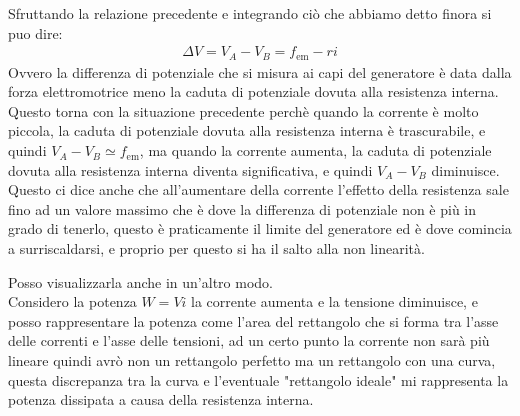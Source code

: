 \documentclass[a4paper, oneside]{article}
\begin{document}
    Sfruttando la relazione precedente e integrando ciò che abbiamo detto finora si puo dire:
    \begin{gather*}
        \Delta V = V_A - V_B = f_\text{em} - r i
    \end{gather*}
    Ovvero la differenza di potenziale che si misura ai capi del generatore è data dalla forza elettromotrice meno la caduta di potenziale dovuta alla resistenza interna.\\
    Questo torna con la situazione precedente perchè quando la corrente è molto piccola, la caduta di potenziale dovuta alla resistenza interna è trascurabile, e quindi $V_A - V_B \simeq f_\text{em}$, ma quando la corrente aumenta, la caduta di potenziale dovuta alla resistenza interna diventa significativa, e quindi $V_A - V_B$ diminuisce.\\
    Questo ci dice anche che all'aumentare della corrente l'effetto della resistenza sale fino ad un valore massimo che è dove la differenza di potenziale non è più in grado di tenerlo, questo è praticamente il limite del generatore ed è dove comincia a surriscaldarsi, e proprio per questo si ha il salto alla non linearità.\\
    \par
    \begin{figure}
    \begin{center}
    \end{center}
    \end{figure}\noindent
    Posso visualizzarla anche in un'altro modo.\\
    Considero la potenza $W = V i$ la corrente aumenta e la tensione diminuisce, e posso rappresentare la potenza come l'area del rettangolo che si forma tra l'asse delle correnti e l'asse delle tensioni, ad un certo punto la corrente non sarà più lineare quindi avrò non un rettangolo perfetto ma un rettangolo con una curva, questa discrepanza tra la curva e l'eventuale "rettangolo ideale" mi rappresenta la potenza dissipata a causa della resistenza interna.
    \hfill\\\hfill\\\hfill\\\hfill\\
\end{document}
